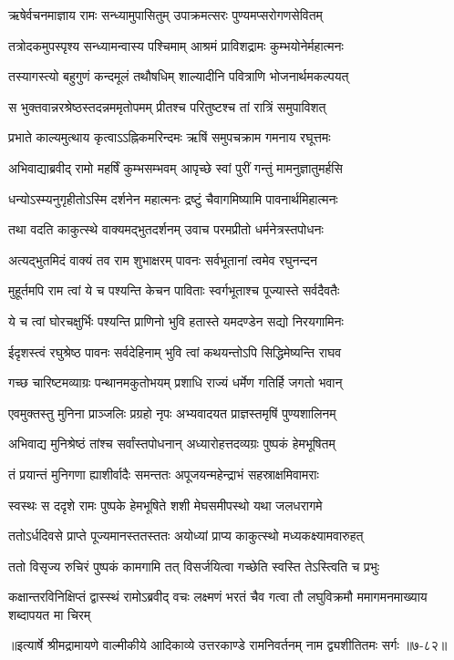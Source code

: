 
\twolineshloka
{ऋषेर्वचनमाज्ञाय रामः सन्ध्यामुपासितुम्}
{उपाक्रमत्सरः पुण्यमप्सरोगणसेवितम्} %

\twolineshloka
{तत्रोदकमुपस्पृश्य सन्ध्यामन्वास्य पश्चिमाम्}
{आश्रमं प्राविशद्रामः कुम्भयोनेर्महात्मनः} %

\twolineshloka
{तस्यागस्त्यो बहुगुणं कन्दमूलं तथौषधिम्}
{शाल्यादीनि पवित्राणि भोजनार्थमकल्पयत्} %

\twolineshloka
{स भुक्तवान्नरश्रेष्ठस्तदन्नममृतोपमम्}
{प्रीतश्च परितुष्टश्च तां रात्रिं समुपाविशत्} %

\twolineshloka
{प्रभाते काल्यमुत्थाय कृत्वाऽऽह्निकमरिन्दमः}
{ऋषिं समुपचक्राम गमनाय रघूत्तमः} %

\twolineshloka
{अभिवाद्याब्रवीद् रामो महर्षिं कुम्भसम्भवम्}
{आपृच्छे स्वां पुरीं गन्तुं मामनुज्ञातुमर्हसि} %

\twolineshloka
{धन्योऽस्म्यनुगृहीतोऽस्मि दर्शनेन महात्मनः}
{द्रष्टुं चैवागमिष्यामि पावनार्थमिहात्मनः} %

\twolineshloka
{तथा वदति काकुत्स्थे वाक्यमद्भुतदर्शनम्}
{उवाच परमप्रीतो धर्मनेत्रस्तपोधनः} %

\twolineshloka
{अत्यद्भुतमिदं वाक्यं तव राम शुभाक्षरम्}
{पावनः सर्वभूतानां त्वमेव रघुनन्दन} %

\twolineshloka
{मुहूर्तमपि राम त्वां ये च पश्यन्ति केचन}
{पाविताः स्वर्गभूताश्च पूज्यास्ते सर्वदैवतैः} %

\twolineshloka
{ये च त्वां घोरचक्षुर्भिः पश्यन्ति प्राणिनो भुवि}
{हतास्ते यमदण्डेन सद्यो निरयगामिनः} %

\twolineshloka
{ईदृशस्त्वं रघुश्रेष्ठ पावनः सर्वदेहिनाम्}
{भुवि त्वां कथयन्तोऽपि सिद्धिमेष्यन्ति राघव} %

\twolineshloka
{गच्छ चारिष्टमव्याग्रः पन्थानमकुतोभयम्}
{प्रशाधि राज्यं धर्मेण गतिर्हि जगतो भवान्} %

\twolineshloka
{एवमुक्तस्तु मुनिना प्राञ्जलिः प्रग्रहो नृपः}
{अभ्यवादयत प्राज्ञस्तमृषिं पुण्यशालिनम्} %

\twolineshloka
{अभिवाद्य मुनिश्रेष्ठं तांश्च सर्वांस्तपोधनान्}
{अध्यारोहत्तदव्यग्रः पुष्पकं हेमभूषितम्} %

\twolineshloka
{तं प्रयान्तं मुनिगणा ह्याशीर्वादैः समन्ततः}
{अपूजयन्महेन्द्राभं सहस्राक्षमिवामराः} %

\twolineshloka
{स्वस्थः स ददृशे रामः पुष्पके हेमभूषिते}
{शशी मेघसमीपस्थो यथा जलधरागमे} %

\twolineshloka
{ततोऽर्धदिवसे प्राप्ते पूज्यमानस्ततस्ततः}
{अयोध्यां प्राप्य काकुत्स्थो मध्यकक्ष्यामवारुहत्} %

\twolineshloka
{ततो विसृज्य रुचिरं पुष्पकं कामगामि तत्}
{विसर्जयित्वा गच्छेति स्वस्ति तेऽस्त्विति च प्रभुः} %

\twolineshloka
{कक्षान्तरविनिक्षिप्तं द्वास्स्थं रामोऽब्रवीद् वचः}
{लक्ष्मणं भरतं चैव गत्वा तौ लघुविक्रमौ ममागमनमाख्याय शब्दापयत मा चिरम्} %


॥इत्यार्षे श्रीमद्रामायणे वाल्मीकीये आदिकाव्ये उत्तरकाण्डे रामनिवर्तनम् नाम द्व्यशीतितमः सर्गः ॥७-८२॥
